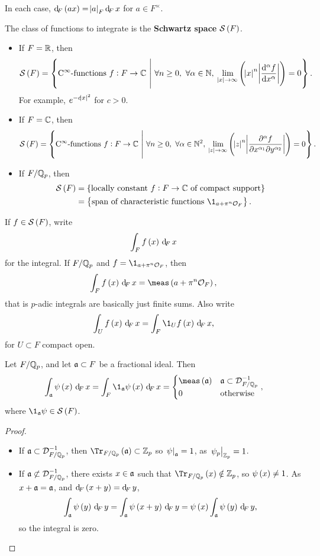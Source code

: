 In each case, $ \dF\br{ax} = \abs{a}_F\dF x $ for $ a \in F^\times $.

\pagebreak

\begin{definition*}
The class of functions to integrate is the \textbf{Schwartz space} $ \SSS\br{F} $.
\begin{itemize}
\item If $ F = \mathbb{R} $, then
$$ \SSS\br{F} = \cbr{\text{$ \C^\infty $-functions} \ f : F \to \CC \st \forall n \ge 0, \ \forall \alpha \in \NN, \ \lim_{\abs{x} \to \infty} \br{\abs{x}^n\abs{\dod[\alpha]{f}{x}}} = 0}. $$
For example, $ e^{-c\abs{x}^2} $ for $ c > 0 $.
\item If $ F = \mathbb{C} $, then
$$ \SSS\br{F} = \cbr{\text{$ \C^\infty $-functions} \ f : F \to \CC \st \forall n \ge 0, \ \forall \alpha \in \NN^2, \ \lim_{\abs{z} \to \infty} \br{\abs{z}^n\abs{\dmd{f}{\alpha}{x}{\alpha_1}{y}{\alpha_2}}} = 0}. $$
\item If $ F / \mathbb{Q}_p $, then
\begin{align*}
\SSS\br{F}
& = \cbr{\text{locally constant} \ f : F \to \CC \ \text{of compact support}} \\
& = \cbr{\text{span of characteristic functions} \ \1_{a + \pi^n\OOO_F}}.
\end{align*}
\end{itemize}
\end{definition*}

If $ f \in \SSS\br{F} $, write
$$ \intF{f\br{x}}{x} $$
for the integral. If $ F / \mathbb{Q}_p $ and $ f = \1_{a + \pi^n\OOO_F} $, then
$$ \intF{f\br{x}}{x} = \meas\br{a + \pi^n\OOO_F}, $$
that is $ p $-adic integrals are basically just finite sums. Also write
$$ \intF[U]{f\br{x}}{x} = \intF{\1_Uf\br{x}}{x}, $$
for $ U \subset F $ compact open.

\begin{lemma}
\label{lem:9.4}
Let $ F / \mathbb{Q}_p $, and let $ \mathfrak{a} \subset F $ be a fractional ideal. Then
$$ \intF[\aaa]{\psi\br{x}}{x} = \intF{\1_\aaa\psi\br{x}}{x} =
\begin{cases}
\meas\br{\aaa} & \aaa \subset \DDD_{F / \QQ_p}^{-1} \\
0 & \text{otherwise}
\end{cases},
$$
where $ \1_\aaa\psi \in \SSS\br{F} $.
\end{lemma}

\begin{proof}
\hfill
\begin{itemize}
\item If $ \mathfrak{a} \subset \mathcal{D}_{F / \mathbb{Q}_p}^{-1} $, then $ \Tr_{F / \QQ_p}\br{\aaa} \subset \ZZ_p $ so $ \left. \psi \right|_{\mathfrak{a}} = 1 $, as $ \left. \psi_p \right|_{\mathbb{Z}_p} = 1 $.
\item If $ \mathfrak{a} \not\subset \mathcal{D}_{F / \mathbb{Q}_p}^{-1} $, there exists $ x \in \mathfrak{a} $ such that $ \Tr_{F / \QQ_p}\br{x} \notin \ZZ_p $, so $ \psi\br{x} \ne 1 $. As $ x + \mathfrak{a} = \mathfrak{a} $, and $ \dF\br{x + y} = \dF y $,
$$ \intF[\aaa]{\psi\br{y}}{y} = \intF[\aaa]{\psi\br{x + y}}{y} = \psi\br{x}\intF[\aaa]{\psi\br{y}}{y}, $$
so the integral is zero.
\end{itemize}
\end{proof}

